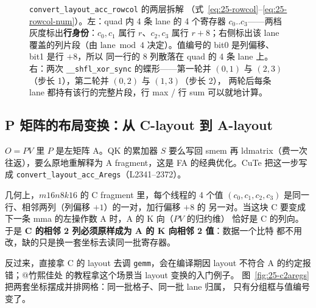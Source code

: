 \begin{figure}[H]
\caption{\texttt{convert\_\allowbreak{}layout\_\allowbreak{}acc\_\allowbreak{}rowcol} 的两层拆解
（式~\eqref{eq:25-rowcol}--\eqref{eq:25-rowcol-num}）。左：quad 内 4 条 lane 的 4 个寄存器
$c_0..c_3$——两档灰度标出\textbf{行身份}：$c_0,c_1$ 属行 $r$、$c_2,c_3$ 属行 $r{+}8$；右侧标出该 lane
覆盖的列片段（由 $\mathrm{lane}\bmod4$ 决定）。值编号的 bit0 是列偏移、bit1 是行 $+8$，所以
同一行的 8 列散落在 quad 的 4 条 lane 上。右：两次 \texttt{\_\allowbreak{}\_\allowbreak{}shfl\_\allowbreak{}xor\_\allowbreak{}sync}
的蝶形——第一轮并 $(0,1)$ 与 $(2,3)$（步长 1），第二轮并 $(0,2)$ 与 $(1,3)$（步长 2），
两轮后每条 lane 都持有该行的完整片段，行 max / 行 sum 可以就地计算。}
\label{fig:25-rowcol-shfl}
\end{figure}

\subsection{P 矩阵的布局变换：从 C-layout 到 A-layout}

$O=PV$ 里 $P$ 是左矩阵 A。QK 的累加器 $S$ 要么写回 smem 再 ldmatrix（费一次
往返），要么原地重解释为 A fragment，这是 FA 的经典优化。CuTe 把这一步写成
\texttt{convert\_\allowbreak{}layout\_\allowbreak{}acc\_\allowbreak{}Aregs}（L2341--2372）。

几何上，$m16n8k16$ 的 C fragment 里，每个线程的 4 个值
$(c_0,c_1,c_2,c_3)$ 是同一行、相邻两列（列偏移 $+1$）的一对，加行偏移 $+8$ 的
另一对。当这块 C 要变成下一条 mma 的左操作数 A 时，A 的 K 向（$PV$ 的归约维）
恰好是 C 的列向。于是 \textbf{C 的相邻 2 列必须原样成为 A 的 K 向相邻 2 值}：数据一个比特
都不用改，缺的只是换一套坐标去读同一批寄存器。

反过来，直接拿 C 的 layout 去调 \texttt{gemm}，会在编译期因 layout 不符合
A 的约定报错；@竹熙佳处 的教程拿这个场景当 layout 变换的入门例子。
图~\ref{fig:25-c2aregs} 把两套坐标摆成并排网格：同一批格子、同一批 lane 归属，
只有分组框与值编号变了。

